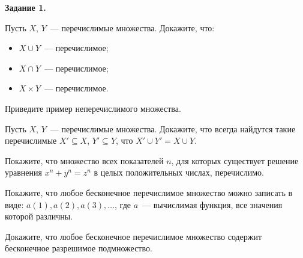 \setcounter{curtask}{1}

\begin{center}
    \bf Задание 1.
\end{center}

\begin{task}
    Пусть $X$, $Y$~--- перечислимые множества. Докажите, что:
    \begin{itemize}
            \item $X \cup Y$~--- перечислимое;
	        \item $X \cap Y$~--- перечислимое;
        	\item $X \times Y$~--- перечислимое.
    \end{itemize}
\end{task}

\begin{task}
    Приведите пример неперечислимого множества.
\end{task}

\begin{task}
    Пусть $X$, $Y$~--- перечислимые множества. Докажите, что всегда
    найдутся такие перечислимые $X' \subseteq X$, $Y' \subseteq Y$,
    что $X' \cup Y' = X \cup Y$.
\end{task}

\begin{task}
    Покажите, что множество всех показателей $n$, для которых
    существует решение уравнения $x^n + y^n = z^n$ в целых положительных числах,
    перечислимо.
\end{task}

\begin{task}
    Покажите, что любое бесконечное перечислимое множество можно
    записать в виде: ${a(1), a(2), a(3), \dots}$, где $a$~---
    вычислимая функция, все значения которой различны.
\end{task}

\begin{task}
    Докажите, что любое бесконечное перечислимое множество содержит
    бесконечное разрешимое подмножество.
\end{task}